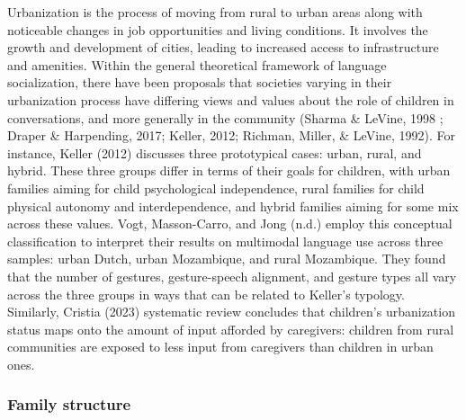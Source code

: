 \documentclass[
  man,floatsintext]{apa6}
\begin{document}
Urbanization is the process of moving from rural to urban areas along with noticeable changes in job opportunities and living conditions. It involves the growth and development of cities, leading to increased access to infrastructure and amenities. Within the general theoretical framework of language socialization, there have been proposals that societies varying in their urbanization process have differing views and values about the role of children in conversations, and more generally in the community (Sharma \& LeVine, 1998 ; Draper \& Harpending, 2017; Keller, 2012; Richman, Miller, \& LeVine, 1992). For instance, Keller (2012) discusses three prototypical cases: urban, rural, and hybrid. These three groups differ in terms of their goals for children, with urban families aiming for child psychological independence, rural families for child physical autonomy and interdependence, and hybrid families aiming for some mix across these values. Vogt, Masson-Carro, and Jong (n.d.) employ this conceptual classification to interpret their results on multimodal language use across three samples: urban Dutch, urban Mozambique, and rural Mozambique. They found that the number of gestures, gesture-speech alignment, and gesture types all vary across the three groups in ways that can be related to Keller's typology. Similarly, Cristia (2023) systematic review concludes that children's urbanization status maps onto the amount of input afforded by caregivers: children from rural communities are exposed to less input from caregivers than children in urban ones.

\hypertarget{family-structure}{%
\subsubsection{Family structure}\label{family-structure}}
\end{document}
